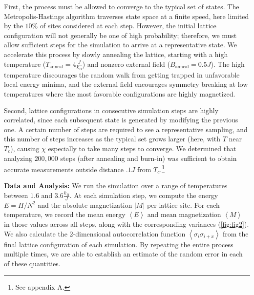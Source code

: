 \documentclass[letter,scriptaddress,twocolumn, prl,nofootinbib]{revtex4}
\newcommand{\submin}[1]{\left\langle #1 \right\rangle}
\begin{document}
First, the process must be allowed to converge to the typical set of states. The Metropolis-Hastings algorithm traverses state space at a finite speed, here limited by the $10\%$ of sites considered at each step. However, the initial lattice configuration will not generally be one of high probability; therefore, we must allow sufficient steps for the simulation to arrive at a representative state. We accelerate this process by slowly annealing the lattice, starting with a high temperature ($T_\text{anneal} = 4 \frac{J}{k_B}$) and nonzero external field ($B_\text{anneal} = 0.5 J$). The high temperature discourages the random walk from getting trapped in unfavorable local energy minima, and the external field encourages symmetry breaking at low temperatures where the most favorable configurations are highly magnetized.

Second, lattice configurations in consecutive simulation steps are highly correlated, since each subsequent state is generated by modifying the previous one. A certain number of steps are required to see a representative sampling, and this number of steps increases as the typical set grows larger (here, with $T$ near $T_c$), causing $\chi$ especially to take many steps to converge. We determined that analyzing $200,000$ steps (after annealing and burn-in) was sufficient to obtain accurate measurements outside distance $.1 J$ from $T_c$.\footnote{See appendix A.}

\textbf{Data and Analysis:} We run the simulation over a range of temperatures between $1.6$ and $3.6\frac{k_B}{J}$. At each simulation step, we compute the energy $E = H / N^2$ and the absolute magnetization $|M|$ per lattice site. For each temperature, we record the mean energy $\submin{E}$ and mean magnetization $\submin{M}$ in those values across all steps, along with the corresponding variances (\autoref{fig:fig2}). We also calculate the 2-dimensional autocorrelation function $\submin{\sigma_i\sigma_{i + x}}$ from the final lattice configuration of each simulation. By repeating the entire process multiple times, we are able to establish an estimate of the random error in each of these quantities. 
\end{document}
